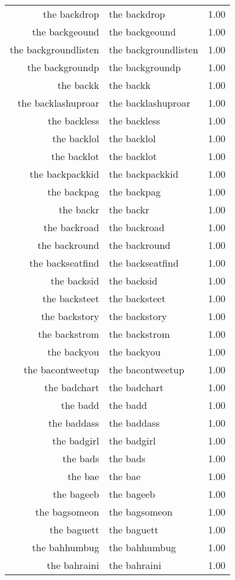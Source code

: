 \begin{table}[ht]
\begin{tabular}{rlr}
  the backdrop & the backdrop & 1.00 \\ 
  the backgeound & the backgeound & 1.00 \\ 
  the backgroundlisten & the backgroundlisten & 1.00 \\ 
  the backgroundp & the backgroundp & 1.00 \\ 
  the backk & the backk & 1.00 \\ 
  the backlashuproar & the backlashuproar & 1.00 \\ 
  the backless & the backless & 1.00 \\ 
  the backlol & the backlol & 1.00 \\ 
  the backlot & the backlot & 1.00 \\ 
  the backpackkid & the backpackkid & 1.00 \\ 
  the backpag & the backpag & 1.00 \\ 
  the backr & the backr & 1.00 \\ 
  the backroad & the backroad & 1.00 \\ 
  the backround & the backround & 1.00 \\ 
  the backseatfind & the backseatfind & 1.00 \\ 
  the backsid & the backsid & 1.00 \\ 
  the backsteet & the backsteet & 1.00 \\ 
  the backstory & the backstory & 1.00 \\ 
  the backstrom & the backstrom & 1.00 \\ 
  the backyou & the backyou & 1.00 \\ 
  the bacontweetup & the bacontweetup & 1.00 \\ 
  the badchart & the badchart & 1.00 \\ 
  the badd & the badd & 1.00 \\ 
  the baddass & the baddass & 1.00 \\ 
  the badgirl & the badgirl & 1.00 \\ 
  the bads & the bads & 1.00 \\ 
  the bae & the bae & 1.00 \\ 
  the bageeb & the bageeb & 1.00 \\ 
  the bagsomeon & the bagsomeon & 1.00 \\ 
  the baguett & the baguett & 1.00 \\ 
  the bahhumbug & the bahhumbug & 1.00 \\ 
  the bahraini & the bahraini & 1.00 \\ 

\end{tabular}
\end{table}
